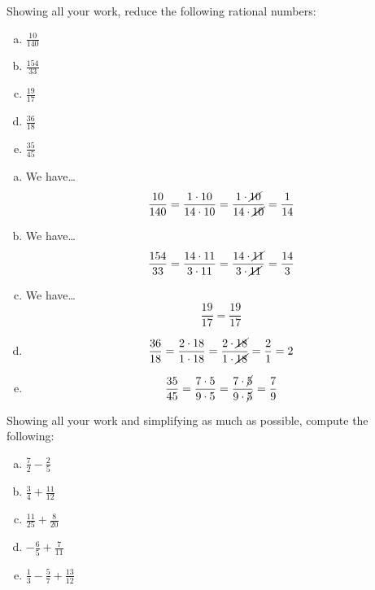 \documentclass[11pt,letterpaper]{article}
\begin{document}

 Showing all your work, reduce the following rational numbers:
	\begin{enumerate}[(a)]
	\item $\frac{10}{140}$
	\item $\frac{154}{33}$
	\item $\frac{19}{17}$
	\item $\frac{36}{18}$
	\item $\frac{35}{45}$
	\end{enumerate} \pspace

\sol 
\begin{enumerate}[(a)]
\item We have\dots
	\[
	\dfrac{10}{140}= \dfrac{1 \cdot 10}{14 \cdot 10}= \dfrac{1 \cdot \cancel{10}}{14 \cdot \cancel{10}}= \dfrac{1}{14} 
	\] \pspace

\item We have\dots
	\[
	\dfrac{154}{33}= \dfrac{14 \cdot 11}{3 \cdot 11}= \dfrac{14 \cdot \cancel{11}}{3 \cdot \cancel{11}}= \dfrac{14}{3}
	\] \pspace

\item We have\dots
	\[
	\dfrac{19}{17}= \dfrac{19}{17}
	\] \pspace

\item 
	\[
	\dfrac{36}{18}= \dfrac{2 \cdot 18}{1 \cdot 18}= \dfrac{2 \cdot \cancel{18}}{1 \cdot \cancel{18}}= \dfrac{2}{1}= 2
	\] \pspace

\item 
	\[
	\dfrac{35}{45}= \dfrac{7 \cdot 5}{9 \cdot 5}= \dfrac{7 \cdot \cancel{5}}{9 \cdot \cancel{5}}= \dfrac{7}{9}
	\]
\end{enumerate}



\newpage



 Showing all your work and simplifying as much as possible, compute the following:
	\begin{enumerate}[(a)]
	\item $\frac{7}{2} - \frac{2}{5}$
	\item $\frac{3}{4} + \frac{11}{12}$
	\item $\frac{11}{25} + \frac{8}{20}$
	\item $-\frac{6}{5} + \frac{7}{11}$
	\item $\frac{1}{3} - \frac{5}{7} + \frac{13}{12}$
	\end{enumerate} \pspace
\end{document}
